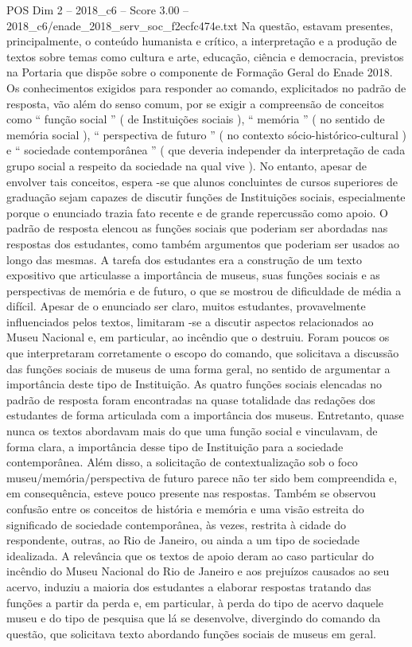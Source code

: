 \begin{textsample}{POS Dim 2 – 2018\_c6 – Score 3.00 – 2018\_c6/enade\_2018\_serv\_soc\_f2ecfc474e.txt}
Na questão, estavam presentes, principalmente, o conteúdo humanista e crítico, a interpretação e a produção de textos sobre temas como cultura e arte, educação, ciência e democracia, previstos na Portaria que dispõe sobre o componente de Formação Geral do Enade 2018.
Os conhecimentos exigidos para responder ao comando, explicitados no padrão de resposta, vão além do senso comum, por se exigir a compreensão de conceitos como “ função social ” ( de Instituições sociais ), “ memória ” ( no sentido de memória social ), “ perspectiva de futuro ” ( no contexto sócio-histórico-cultural ) e “ sociedade contemporânea ” ( que deveria independer da interpretação de cada grupo social a respeito da sociedade na qual vive ).
No entanto, apesar de envolver tais conceitos, espera -se que alunos concluintes de cursos superiores de graduação sejam capazes de discutir funções de Instituições sociais, especialmente porque o enunciado trazia fato recente e de grande repercussão como apoio.
O padrão de resposta elencou as funções sociais que poderiam ser abordadas nas respostas dos estudantes, como também argumentos que poderiam ser usados ao longo das mesmas.
A tarefa dos estudantes era a construção de um texto expositivo que articulasse a importância de museus, suas funções sociais e as perspectivas de memória e de futuro, o que se mostrou de dificuldade de média a difícil.
Apesar de o enunciado ser claro, muitos estudantes, provavelmente influenciados pelos textos, limitaram -se a discutir aspectos relacionados ao Museu Nacional e, em particular, ao incêndio que o destruiu.
Foram poucos os que interpretaram corretamente o escopo do comando, que solicitava a discussão das funções sociais de museus de uma forma geral, no sentido de argumentar a importância deste tipo de Instituição.
As quatro funções sociais elencadas no padrão de resposta foram encontradas na quase totalidade das redações dos estudantes de forma articulada com a importância dos museus.
Entretanto, quase nunca os textos abordavam mais do que uma função social e vinculavam, de forma clara, a importância desse tipo de Instituição para a sociedade contemporânea.
Além disso, a solicitação de contextualização sob o foco museu/memória/perspectiva de futuro parece não ter sido bem compreendida e, em consequência, esteve pouco presente nas respostas.
Também se observou confusão entre os conceitos de história e memória e uma visão estreita do significado de sociedade contemporânea, às vezes, restrita à cidade do respondente, outras, ao Rio de Janeiro, ou ainda a um tipo de sociedade idealizada.
A relevância que os textos de apoio deram ao caso particular do incêndio do Museu Nacional do Rio de Janeiro e aos prejuízos causados ao seu acervo, induziu a maioria dos estudantes a elaborar respostas tratando das funções a partir da perda e, em particular, à perda do tipo de acervo daquele museu e do tipo de pesquisa que lá se desenvolve, divergindo do comando da questão, que solicitava texto abordando funções sociais de museus em geral.

\end{textsample}
